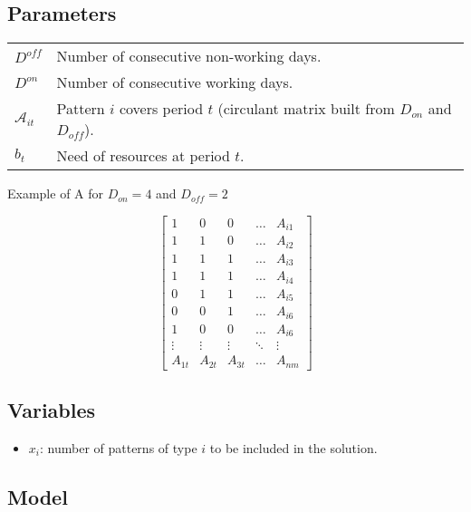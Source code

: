 \documentclass[a4paper,11pt]{article}
\begin{document}
    \vskip 0.3cm

    \subsection{Parameters}

    \begin{tabular}{ll}
        $D^{off}$ & Number of consecutive non-working days. \\
        $D^{on}$ & Number of consecutive working days. \\
        $\mathcal{A}_{it}$ & Pattern $i$ covers period $t$ (circulant matrix built from $D_{on}$ and $D_{off}$).\\
        $b_{t}$ & Need of resources at period $t$. \\
    \end{tabular}

    \vskip 0.3cm

    Example of A for $D_{on}=4$ and $D_{off}=2$

    $$
    \begin{bmatrix}
        1 & 0 & 0 & \dots  & A_{i1} \\
        1 & 1 & 0 & \dots  & A_{i2} \\
        1 & 1 & 1 & \dots  & A_{i3} \\
        1 & 1 & 1 & \dots  & A_{i4} \\
        0 & 1 & 1 & \dots  & A_{i5} \\
        0 & 0 & 1 & \dots  & A_{i6} \\
        1 & 0 & 0 & \dots  & A_{i6} \\
        \vdots & \vdots & \vdots & \ddots & \vdots \\
        A_{1t} & A_{2t} & A_{3t} & \dots  & A_{nm}
    \end{bmatrix}
    $$

    \subsection{Variables}

    \begin{itemize}
     \item $x_i$: number of patterns of type $i$ to be included in the solution.
    \end{itemize}

    \subsection{Model}
\end{document}
